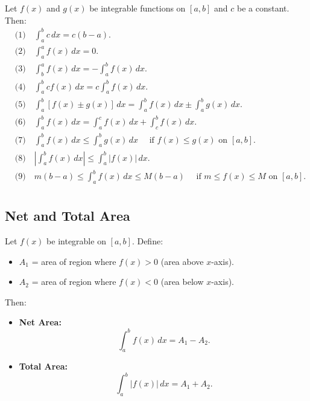 \documentclass[a4paper,11pt]{article}
\begin{document}
\begin{tcolorbox}[breakable]
    Let $f(x)$ and $g(x)$ be integrable functions on $[a,b]$ and $c$ be a constant. Then:
    \[
    \begin{aligned}
        &\text{(1)} \quad \int_{a}^{b}c \, dx = c(b-a). \\[8pt]
        &\text{(2)} \quad \int_{a}^{a}f(x) \, dx = 0. \\[8pt]
        &\text{(3)} \quad \int_{b}^{a}f(x) \, dx = -\int_{a}^{b}f(x) \, dx. \\[8pt]
        &\text{(4)} \quad \int_{a}^{b}cf(x) \, dx = c \int_{a}^{b}f(x) \, dx. \\[8pt]
        &\text{(5)} \quad \int_{a}^{b}\left[f(x) \pm g(x)\right] \, dx = \int_{a}^{b}f(x) \, dx \pm \int_{a}^{b}g(x) \, dx. \\[8pt]
        &\text{(6)} \quad \int_{a}^{b}f(x) \, dx = \int_{a}^{c}f(x) \, dx + \int_{c}^{b}f(x) \, dx. \\[8pt]
        &\text{(7)} \quad \int_{a}^{b}f(x) \, dx \leq \int_{a}^{b}g(x) \, dx \quad \text{ if } f(x) \leq g(x) \text{ on } [a,b]. \\[8pt]
        &\text{(8)} \quad \left| \int_{a}^{b}f(x) \, dx \right| \leq \int_{a}^{b} \left|f(x)\right| \, dx. \\[8pt]
        &\text{(9)} \quad m(b-a) \leq \int_{a}^{b}f(x) \, dx \leq M(b-a) \quad \text{ if } m \leq f(x) \leq M \text{ on } [a,b]. \\[8pt]
    \end{aligned}
    \]
\end{tcolorbox}




\subsection{Net and Total Area}

\begin{tcolorbox}
    Let $f(x)$ be integrable on $[a,b]$. Define:
    \begin{itemize}
        \item $A_1$ = area of region where $f(x) > 0$ (area above $x$-axis).
        \item $A_2$ = area of region where $f(x) < 0$ (area below $x$-axis).
    \end{itemize}
    Then:
    \begin{itemize}
        \item \textbf{Net Area:}
        \[
        \int_{a}^{b} f(x) \, dx = A_1 - A_2.
        \]
        \item \textbf{Total Area:}
        \[
        \int_{a}^{b} \left| f(x) \right| \, dx = A_1 + A_2.
        \]
    \end{itemize}
\end{tcolorbox}
\end{document}
